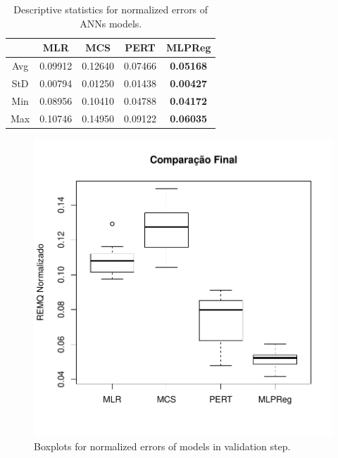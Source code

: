 \begin{table}[h]
\caption{Descriptive statistics for normalized errors of ANNs models.}\label{tab:validacao_descriptive} \centering
\begin{tabular}{|c|c|c|c|c|}
  \hline
   & MLR & MCS & PERT & MLPReg  \\
  \hline
  Avg & 0.09912 & 0.12640 & 0.07466 & \textbf{0.05168}   \\
  \hline
  StD & 0.00794 & 0.01250 & 0.01438 & \textbf{0.00427}   \\
  \hline
  Min & 0.08956 & 0.10410 & 0.04788	 & \textbf{0.04172}   \\
  \hline
  Max & 0.10746 & 0.14950 & 0.09122 & \textbf{0.06035}   \\
  \hline
\end{tabular}
\end{table}

\begin{figure}[!h]
  \vspace{-0.2cm}
  \centering
  \includegraphics[trim = 1mm 12mm 1mm 1mm,clip,width=0.7\columnwidth]{image/validacao_ex5.pdf}
  \caption{Boxplots for normalized errors of models in validation step.}
  \label{fig:validacao_result}
\end{figure}

